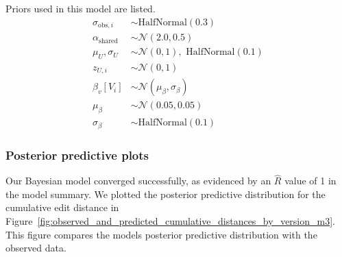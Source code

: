 Priors used in this model are listed.
\begin{align}
    \sigma_{\text{obs},i} &\sim \text{HalfNormal}(0.3) \label{eq:model3_prior_sigma} \\
    \alpha_{\text{shared}} &\sim \mathcal{N}(2.0, 0.5) \label{eq:model3_prior_shared} \\
    \mu_{U}, \sigma_{U} &\sim \mathcal{N}(0, 1), \text{ HalfNormal}(0.1) \label{eq:model3_prior_user} \\
    z_{U,i} &\sim \mathcal{N}(0, 1) \label{eq:model3_prior_z} \\
    \beta_v[V_i] &\sim \mathcal{N}(\mu_{\beta}, \sigma_{\beta}) \label{eq:model3_prior_beta} \\
    \mu_{\beta} &\sim \mathcal{N}(0.05, 0.05) \label{eq:model3_prior_beta_mu}\\
    \sigma_{\beta} &\sim \text{HalfNormal}(0.1) \label{eq:model3_prior_beta_sigma}
\end{align}


\subsubsection{Posterior predictive plots}
Our Bayesian model converged successfully, as evidenced by an $\hat{R}$ value of 1 in the model summary. We plotted the posterior predictive distribution for the cumulative edit distance in Figure~\ref{fig:observed_and_predicted_cumulative_distances_by_version_m3}. This figure compares the models posterior predictive distribution with the observed data.



